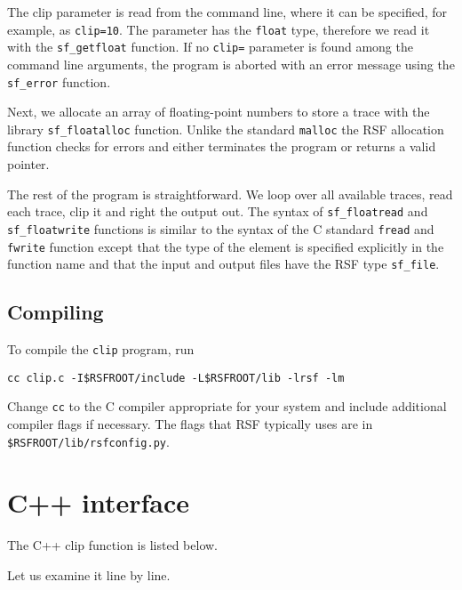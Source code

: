  
The clip parameter is read from the command line, where it can be
specified, for example, as \texttt{clip=10}. The parameter has the
\texttt{float} type, therefore we read it with the
\texttt{sf\_getfloat} function. If no \texttt{clip=} parameter is
found among the command line arguments, the program is aborted with an
error message using the \texttt{sf\_error} function.

 
Next, we allocate an array of floating-point numbers to store a trace
with the library \texttt{sf\_floatalloc} function. Unlike the standard
\texttt{malloc} the RSF allocation function checks for errors and
either terminates the program or returns a valid pointer.

 
The rest of the program is straightforward. We loop over all available
traces, read each trace, clip it and right the output out. The syntax
of \texttt{sf\_floatread} and \texttt{sf\_floatwrite} functions is
similar to the syntax of the C standard \texttt{fread} and
\texttt{fwrite} function except that the type of the element is
specified explicitly in the function name and that the input and
output files have the RSF type \texttt{sf\_file}.

\subsection{Compiling}

To compile the \texttt{clip} program, run
\begin{verbatim}
cc clip.c -I$RSFROOT/include -L$RSFROOT/lib -lrsf -lm
\end{verbatim}
Change \texttt{cc} to the C compiler appropriate for your system and include
additional compiler flags if necessary. The flags that RSF typically uses are
in \texttt{\$RSFROOT/lib/rsfconfig.py}.

\section{C++ interface}

\lstset{language=c++}
\renewcommand{\rsfclip}{\RSF/api/c++/test/clip.cc}

The C++ clip function is listed below.


Let us examine it line by line. 

